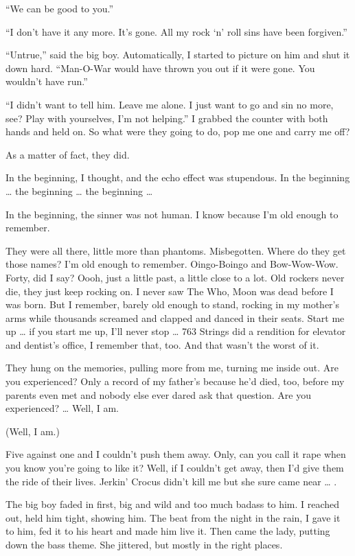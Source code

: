 “We can be good to you.”

“I don't have it any more. It's gone. All my rock ‘n' roll sins have been forgiven.”

“Untrue,” said the big boy. Automatically, I started to picture on him and shut it down hard. “Man-O-War would have thrown you out if it were gone. You wouldn't have run.”

“I didn't want to tell him. Leave me alone. I just want to go and sin no more, see? Play with yourselves, I'm not helping.” I grabbed the counter with both hands and held on. So what were they going to do, pop me one and carry me off?

As a matter of fact, they did.

In the beginning, I thought, and the echo effect was stupendous. In the beginning … the beginning … the beginning …

In the beginning, the sinner was not human. I know because I'm old enough to remember.

They were all there, little more than phantoms. Misbegotten. Where do they get those names? I'm old enough to remember. Oingo-Boingo and Bow-Wow-Wow. Forty, did I say? Oooh, just a little past, a little close to a lot. Old rockers never die, they just keep rocking on. I never saw The Who, Moon was dead before I was born. But I remember, barely old enough to stand, rocking in my mother's arms while thousands screamed and clapped and danced in their seats. Start me up … if you start me up, I'll never stop … 763 Strings did a rendition for elevator and dentist's office, I remember that, too. And that wasn't the worst of it.

They hung on the memories, pulling more from me, turning me inside out. Are you experienced? Only a record of my father's because he'd died, too, before my parents even met and nobody else ever dared ask that question. Are you experienced? … Well, I am.

(Well, I am.)

Five against one and I couldn't push them away. Only, can you call it rape when you know you're going to like it? Well, if I couldn't get away, then I'd give them the ride of their lives. Jerkin' Crocus didn't kill me but she sure came near … .

The big boy faded in first, big and wild and too much badass to him. I reached out, held him tight, showing him. The beat from the night in the rain, I gave it to him, fed it to his heart and made him live it. Then came the lady, putting down the bass theme. She jittered, but mostly in the right places.

